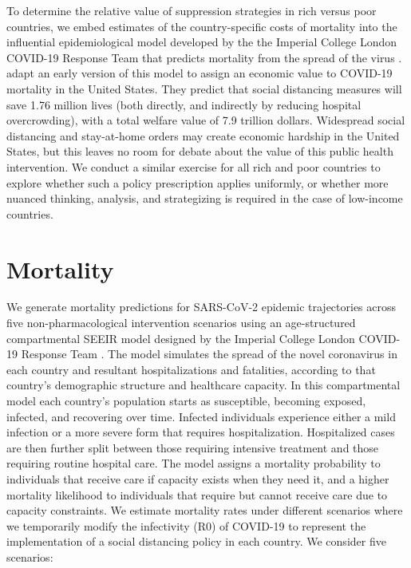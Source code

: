 \documentclass[11pt]{article}
\begin{document}
To determine the relative value of suppression strategies in rich versus poor countries, we embed estimates of the country-specific costs of mortality into the influential epidemiological model developed by the the Imperial College London COVID-19 Response Team that predicts mortality from the spread of the virus \parencite{squire,ferguson2020,walker2020}. \textcite{greenstone2020} adapt an early version of this model to assign an economic value to COVID-19 mortality in the United States. They predict that social distancing measures will save 1.76 million lives (both directly, and indirectly by reducing hospital overcrowding), with a total welfare value of 7.9 trillion dollars. Widespread social distancing and stay-at-home orders may create economic hardship in the United States, but this leaves no room for debate about the value of this public health intervention. We conduct a similar exercise for all rich and poor countries to explore whether such a policy prescription applies uniformly, or whether more nuanced thinking, analysis, and strategizing is required in the case of low-income countries.


\section{Mortality}

We generate mortality predictions for SARS-CoV-2 epidemic trajectories across five non-pharmacological intervention scenarios using an age-structured compartmental SEEIR model designed by the Imperial College London COVID-19 Response Team \parencite{squire}. The model simulates the spread of the novel coronavirus in each country and resultant hospitalizations and fatalities, according to that country's demographic structure and healthcare capacity. In this compartmental model each country's population starts as susceptible, becoming exposed, infected, and recovering over time. Infected individuals experience either a mild infection or a more severe form that requires hospitalization. Hospitalized cases are then further split between those requiring intensive treatment and those requiring routine hospital care. The model assigns a mortality probability to individuals that receive care if capacity exists when they need it, and a higher mortality likelihood to individuals that require but cannot receive care due to capacity constraints. We estimate mortality rates under different scenarios where we temporarily modify the infectivity (R0) of COVID-19 to represent the implementation of a social distancing policy in each country. We consider five scenarios:
\end{document}

